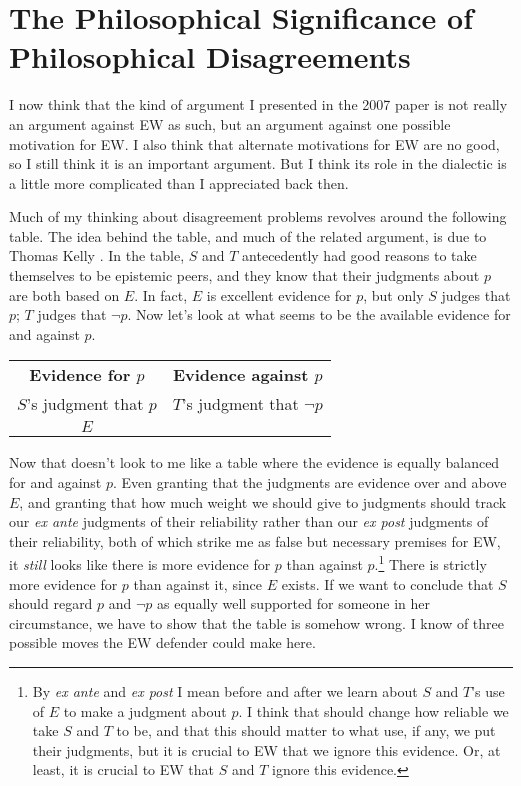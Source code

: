 \section{The Philosophical Significance of Philosophical Disagreements}

\noindent I now think that the kind of argument I presented in the 2007 paper is not really an argument against EW as such, but an argument against one possible motivation for EW. I also think that alternate motivations for EW are no good, so I still think it is an important argument. But I think its role in the dialectic is a little more complicated than I appreciated back then.

Much of my thinking about disagreement problems revolves around the following table. The idea behind the table, and much of the related argument, is due to Thomas Kelly \citeyearpar{Kelly2010-KELPDA}. In the table, $S$ and $T$ antecedently had good reasons to take themselves to be epistemic peers, and they know that their judgments about $p$ are both based on $E$. In fact, $E$ is excellent evidence for $p$, but only $S$ judges that $p$; $T$ judges that $\neg p$. Now let's look at what seems to be the available evidence for and against $p$.

\begin{center}
\begin{tabular}{c c}
\textbf{Evidence for $p$} & \textbf{Evidence against $p$} \\
$S$'s judgment that $p$ & $T$'s judgment that $\neg p$ \\
$E$ & \\
\end{tabular}
\end{center}

\noindent Now that doesn't look to me like a table where the evidence is equally balanced for and against $p$. Even granting that the judgments are evidence over and above $E$, and granting that how much weight we should give to judgments should track our \textit{ex ante} judgments of their reliability rather than our \textit{ex post} judgments of their reliability, both of which strike me as false but necessary premises for EW, it \textit{still} looks like there is more evidence for $p$ than against $p$.\footnote{By \textit{ex ante} and \textit{ex post} I mean before and after we learn about $S$ and $T$'s use of $E$ to make a judgment about $p$. I think that should change how reliable we take $S$ and $T$ to be, and that this should matter to what use, if any, we put their judgments, but it is crucial to EW that we ignore this evidence. Or, at least, it is crucial to EW that $S$ and $T$ ignore this evidence.} There is strictly more evidence for $p$ than against it, since $E$ exists. If we want to conclude that $S$ should regard $p$ and $\neg p$ as equally well supported for someone in her circumstance, we have to show that the table is somehow wrong. I know of three possible moves the EW defender could make here.

